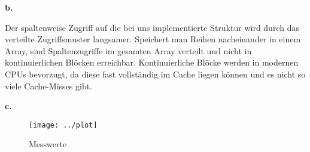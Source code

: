 \documentclass[12pt]{article}
\begin{document}
\noindent \textbf{b.}

Der spaltenweise Zugriff auf die bei uns implementierte Struktur wird durch das verteilte Zugriffsmuster langsamer. Speichert man Reihen nacheinander in einem Array, sind Spaltenzugriffe im gesamten Array verteilt und nicht in kontinuierlichen Blöcken erreichbar. Kontinuierliche Blöcke werden in modernen CPUs bevorzugt, da diese fast vollständig im Cache liegen können und es nicht so viele Cache-Misses gibt.

\noindent \textbf{c.}

\begin{figure}[ht]
	\centering
	\texttt{[image: ../plot]}
	\caption[Messwerte]{Messwerte}
	\label{fig:plot}
\end{figure}
\end{document}
